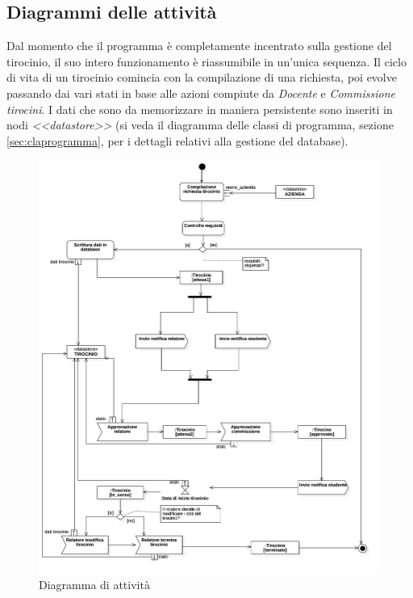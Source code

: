 \documentclass[12pt]{article}
\begin{document}
\newpage


\subsection{Diagrammi delle attività}

Dal momento che il programma è completamente incentrato sulla gestione del tirocinio, il suo intero funzionamento è riassumibile in un'unica sequenza. Il ciclo di vita di un tirocinio comincia con la compilazione di una richiesta, poi evolve passando dai vari stati in base alle azioni compiute da \emph{Docente} e \emph{Commissione tirocini}. I dati che sono da memorizzare in maniera persistente sono inseriti in nodi \emph{<<datastore>>} (si veda il diagramma delle classi di programma, sezione \ref{sec:claprogramma}, per i dettagli relativi alla gestione del database).

\begin{figure}[h!]
   \centering
   \includegraphics[width=\textwidth]{images/ActivityDiagram1.jpg}
   \caption*{Diagramma di attività}
\end{figure}
\end{document}
